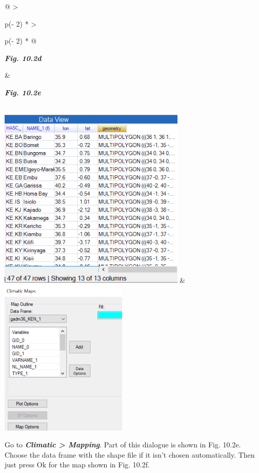 \documentclass[
  letterpaper,
  DIV=11,
  numbers=noendperiod]{scrreprt}
\begin{document}
\begin{longtable}[]{@{}
  >{\raggedright\arraybackslash}p{(\columnwidth - 2\tabcolsep) * }
  >{\raggedright\arraybackslash}p{(\columnwidth - 2\tabcolsep) * }@{}}
\toprule\noalign{}
\begin{minipage}[b]{\linewidth}\raggedright
\textbf{\emph{Fig. 10.2d}}
\end{minipage} & \begin{minipage}[b]{\linewidth}\raggedright
\textbf{\emph{Fig. 10.2e}}
\end{minipage} \\
\midrule\noalign{}
\endhead
\bottomrule\noalign{}
\endlastfoot
\includegraphics[width=3.50709in,height=3.41927in]{figures/Fig10.2d.png}
&
\includegraphics[width=2.38073in,height=2.94431in]{figures/Fig10.2e.png} \\
\end{longtable}

Go to \textbf{\emph{Climatic \textgreater{} Mapping}}. Part of this
dialogue is shown in Fig. 10.2e. Choose the data frame with the shape
file if it isn't chosen automatically. Then just press Ok for the map
shown in Fig. 10.2f.
\end{document}
